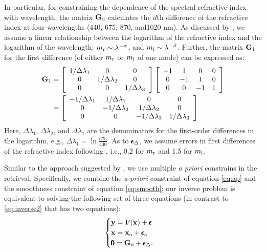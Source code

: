 In particular, for constraining the dependence of the spectral
refractive index with wavelength, the matrix $\mathbf{G}_\text{d}$ calculates the $d$th
difference of the refractive index at four wavelengths (440, 675, 870,
and1020 nm). As discussed by \citet{Dubovik00a}, we assume a linear
relationship between the logarithm of the refractive index and the
logarithm of the wavelength: $m_\text{r} \sim \lambda^{-\alpha}$, and
$m_\text{i} \sim \lambda^{-\beta}$. Further, the matrix $\mathbf{G}_1$  for 
the first difference (of either $m_\text{r}$ or $m_\text{i}$ of one mode) 
can be expressed as:
\begingroup
\allowdisplaybreaks
\begin{align}
\mathbf{G}_1 
&= 
\left[
    \begin{array}{ccc}
    1/{\Delta\lambda_1} & 0 & 0 \\
    0 & 1/{\Delta\lambda_2} & 0 \\
    0 & 0 & 1/{\Delta\lambda_3}  
    \end{array} 
\right] 
\left[
    \begin{array}{cccc}
    -1 & 1 & 0 & 0 \\
    0 & -1 & 1 & 0 \\
    0 & 0 & -1 & 1
    \end{array} 
\right] 
\nonumber \\
&= 
\left[
    \begin{array}{cccc}
    -1/{\Delta\lambda_1} & 1/{\Delta\lambda_1} & 0 & 0 \\
    0 & -1/{\Delta\lambda_2} & 1/{\Delta\lambda_2} & 0 \\
    0 & 0 & -1/{\Delta\lambda_3} & 1/{\Delta\lambda_3}
    \end{array} 
\right]
\end{align}
\endgroup
Here, $\Delta\lambda_1$, $\Delta\lambda_2$, and $\Delta\lambda_1$ are
the denominators for the first-order differences in the logarithm, e.g.,
$\Delta\lambda_1=\ln{\frac{675}{440}}$. As to $\pmb{\epsilon}_\Delta$, we assume 
errors in first differences of the refractive index following 
\citet{Dubovik00a}, i.e., 0.2 for $m_\text{r}$ and 1.5 for $m_\text{i}$.

Similar to the approach suggested by \citet{Dubovik00a}, we use
multiple \textit{a priori} constrains in the retrieval.  Specifically, 
we combine the \textit{a priori} constraint of equation \eqref{eq:ap} 
and the smoothness constraint of equation \eqref{eq:smooth}; 
our inverse problem is equivalent to solving the following set of three
equations (in contrast to \eqref{eq:inverse2} that has two
equations):
\begin{equation}
\begin{cases}
\mathbf{y} = \mathbf{F}(\mathbf{x}) + \pmb{\epsilon}  \\
\mathbf{x} = \mathbf{x}_\text{a} + \pmb{\epsilon}_\text{a} \\
\pmb{0} = \mathbf{G}_\text{d}+\pmb{\epsilon}_\Delta.
\end{cases}
\label{eq:inverse3}
\end{equation}

